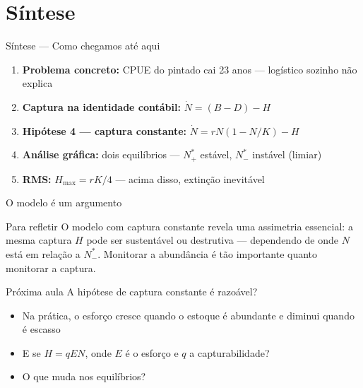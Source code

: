 \documentclass[12pt]{beamer}
\begin{document}
\section{Síntese}

\begin{frame}{Síntese --- Como chegamos até aqui}

  \begin{enumerate}
    \item \textbf{Problema concreto:} CPUE do pintado cai 23 anos
      --- logístico sozinho não explica
    \bigskip
    \item \textbf{Captura na identidade contábil:}
      $\dot{N} = (B - D) - H$
    \bigskip
    \item \textbf{Hipótese 4 --- captura constante:}
      $\dot{N} = rN(1 - N/K) - H$
    \bigskip
    \item \textbf{Análise gráfica:} dois equilíbrios
      --- $N^*_+$ estável, $N^*_-$ instável (limiar)
    \bigskip
    \item \textbf{RMS:} $H_{\max} = rK/4$ ---
      acima disso, extinção inevitável
  \end{enumerate}

\end{frame}

\begin{frame}{O modelo é um argumento}

  \begin{block}{Para refletir}
    O modelo com captura constante revela uma assimetria essencial:
    a mesma captura $H$ pode ser sustentável ou destrutiva ---
    dependendo de onde $N$ está em relação a $N^*_-$.
    Monitorar a abundância é tão importante quanto monitorar a captura.
  \end{block}

  \bigskip
  \begin{exampleblock}{Próxima aula}
    A hipótese de captura constante é razoável?
    \begin{itemize}
      \item Na prática, o esforço cresce quando o estoque é abundante
        e diminui quando é escasso
      \item E se $H = qEN$, onde $E$ é o esforço e $q$ a capturabilidade?
      \item O que muda nos equilíbrios?
    \end{itemize}
  \end{exampleblock}

\end{frame}
\end{document}
